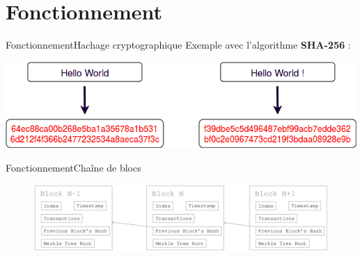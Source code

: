 \documentclass[xcolor=dvipsnames]{beamer}
\begin{document}
\section{Fonctionnement}

\begin{frame}{Fonctionnement}{Hachage cryptographique}
	Exemple avec l'algorithme \textbf{SHA-256} :
	\vspace{1cm}
	\begin{center}
		\includegraphics[scale=0.4]{hash.png} 
	\end{center}
\end{frame}

\begin{frame}{Fonctionnement}{Chaîne de blocs}
	\begin{center}
		\begin{figure}
			\includegraphics[scale=0.20]{blockchain.png} 
		\end{figure}
	\end{center}
\end{frame}
\end{document}
